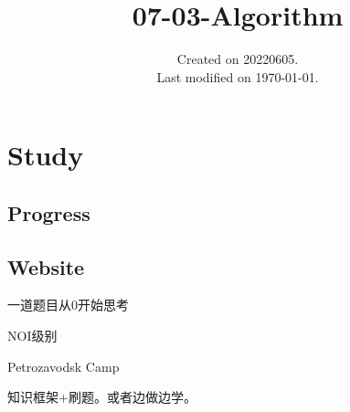 \documentclass[UTF8]{../computerUniverse}
\begin{document}
\title{07-03-Algorithm}
\date{Created on 20220605.\\   Last modified on \today.}
\maketitle
\tableofcontents





\chapter{Study}

\section{Progress}



\section{Website}


一道题目从0开始思考

NOI级别

Petrozavodsk Camp


知识框架+刷题。或者边做边学。
\end{document}
